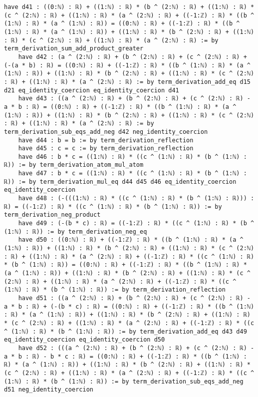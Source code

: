 \documentclass{article}
\begin{document}
\begin{tcolorbox}[colback=white!10, width=\linewidth]
\begin{lstlisting}[language=Lean4]
    have d41 : ((0:ℕ) : ℝ) + ((1:ℕ) : ℝ) * (b ^ (2:ℕ) : ℝ) + ((1:ℕ) : ℝ) * (c ^ (2:ℕ) : ℝ) + ((1:ℕ) : ℝ) * (a ^ (2:ℕ) : ℝ) + ((-1:ℤ) : ℝ) * ((b ^ (1:ℕ) : ℝ) * (a ^ (1:ℕ) : ℝ)) = ((0:ℕ) : ℝ) + ((-1:ℤ) : ℝ) * ((b ^ (1:ℕ) : ℝ) * (a ^ (1:ℕ) : ℝ)) + ((1:ℕ) : ℝ) * (b ^ (2:ℕ) : ℝ) + ((1:ℕ) : ℝ) * (c ^ (2:ℕ) : ℝ) + ((1:ℕ) : ℝ) * (a ^ (2:ℕ) : ℝ) := by term_derivation_sum_add_product_greater
    have d42 : (a ^ (2:ℕ) : ℝ) + (b ^ (2:ℕ) : ℝ) + (c ^ (2:ℕ) : ℝ) + (-(a * b) : ℝ) = ((0:ℕ) : ℝ) + ((-1:ℤ) : ℝ) * ((b ^ (1:ℕ) : ℝ) * (a ^ (1:ℕ) : ℝ)) + ((1:ℕ) : ℝ) * (b ^ (2:ℕ) : ℝ) + ((1:ℕ) : ℝ) * (c ^ (2:ℕ) : ℝ) + ((1:ℕ) : ℝ) * (a ^ (2:ℕ) : ℝ) := by term_derivation_add_eq d15 d21 eq_identity_coercion eq_identity_coercion d41
    have d43 : ((a ^ (2:ℕ) : ℝ) + (b ^ (2:ℕ) : ℝ) + (c ^ (2:ℕ) : ℝ) - a * b : ℝ) = ((0:ℕ) : ℝ) + ((-1:ℤ) : ℝ) * ((b ^ (1:ℕ) : ℝ) * (a ^ (1:ℕ) : ℝ)) + ((1:ℕ) : ℝ) * (b ^ (2:ℕ) : ℝ) + ((1:ℕ) : ℝ) * (c ^ (2:ℕ) : ℝ) + ((1:ℕ) : ℝ) * (a ^ (2:ℕ) : ℝ) := by term_derivation_sub_eqs_add_neg d42 neg_identity_coercion
    have d44 : b = b := by term_derivation_reflection
    have d45 : c = c := by term_derivation_reflection
    have d46 : b * c = ((1:ℕ) : ℝ) * ((c ^ (1:ℕ) : ℝ) * (b ^ (1:ℕ) : ℝ)) := by term_derivation_atom_mul_atom
    have d47 : b * c = ((1:ℕ) : ℝ) * ((c ^ (1:ℕ) : ℝ) * (b ^ (1:ℕ) : ℝ)) := by term_derivation_mul_eq d44 d45 d46 eq_identity_coercion eq_identity_coercion
    have d48 : (-(((1:ℕ) : ℝ) * ((c ^ (1:ℕ) : ℝ) * (b ^ (1:ℕ) : ℝ))) : ℝ) = ((-1:ℤ) : ℝ) * ((c ^ (1:ℕ) : ℝ) * (b ^ (1:ℕ) : ℝ)) := by term_derivation_neg_product
    have d49 : (-(b * c) : ℝ) = ((-1:ℤ) : ℝ) * ((c ^ (1:ℕ) : ℝ) * (b ^ (1:ℕ) : ℝ)) := by term_derivation_neg_eq
    have d50 : ((0:ℕ) : ℝ) + ((-1:ℤ) : ℝ) * ((b ^ (1:ℕ) : ℝ) * (a ^ (1:ℕ) : ℝ)) + ((1:ℕ) : ℝ) * (b ^ (2:ℕ) : ℝ) + ((1:ℕ) : ℝ) * (c ^ (2:ℕ) : ℝ) + ((1:ℕ) : ℝ) * (a ^ (2:ℕ) : ℝ) + ((-1:ℤ) : ℝ) * ((c ^ (1:ℕ) : ℝ) * (b ^ (1:ℕ) : ℝ)) = ((0:ℕ) : ℝ) + ((-1:ℤ) : ℝ) * ((b ^ (1:ℕ) : ℝ) * (a ^ (1:ℕ) : ℝ)) + ((1:ℕ) : ℝ) * (b ^ (2:ℕ) : ℝ) + ((1:ℕ) : ℝ) * (c ^ (2:ℕ) : ℝ) + ((1:ℕ) : ℝ) * (a ^ (2:ℕ) : ℝ) + ((-1:ℤ) : ℝ) * ((c ^ (1:ℕ) : ℝ) * (b ^ (1:ℕ) : ℝ)) := by term_derivation_reflection
    have d51 : ((a ^ (2:ℕ) : ℝ) + (b ^ (2:ℕ) : ℝ) + (c ^ (2:ℕ) : ℝ) - a * b : ℝ) + (-(b * c) : ℝ) = ((0:ℕ) : ℝ) + ((-1:ℤ) : ℝ) * ((b ^ (1:ℕ) : ℝ) * (a ^ (1:ℕ) : ℝ)) + ((1:ℕ) : ℝ) * (b ^ (2:ℕ) : ℝ) + ((1:ℕ) : ℝ) * (c ^ (2:ℕ) : ℝ) + ((1:ℕ) : ℝ) * (a ^ (2:ℕ) : ℝ) + ((-1:ℤ) : ℝ) * ((c ^ (1:ℕ) : ℝ) * (b ^ (1:ℕ) : ℝ)) := by term_derivation_add_eq d43 d49 eq_identity_coercion eq_identity_coercion d50
    have d52 : (((a ^ (2:ℕ) : ℝ) + (b ^ (2:ℕ) : ℝ) + (c ^ (2:ℕ) : ℝ) - a * b : ℝ) - b * c : ℝ) = ((0:ℕ) : ℝ) + ((-1:ℤ) : ℝ) * ((b ^ (1:ℕ) : ℝ) * (a ^ (1:ℕ) : ℝ)) + ((1:ℕ) : ℝ) * (b ^ (2:ℕ) : ℝ) + ((1:ℕ) : ℝ) * (c ^ (2:ℕ) : ℝ) + ((1:ℕ) : ℝ) * (a ^ (2:ℕ) : ℝ) + ((-1:ℤ) : ℝ) * ((c ^ (1:ℕ) : ℝ) * (b ^ (1:ℕ) : ℝ)) := by term_derivation_sub_eqs_add_neg d51 neg_identity_coercion

\end{lstlisting}
\end{tcolorbox}
\end{document}
